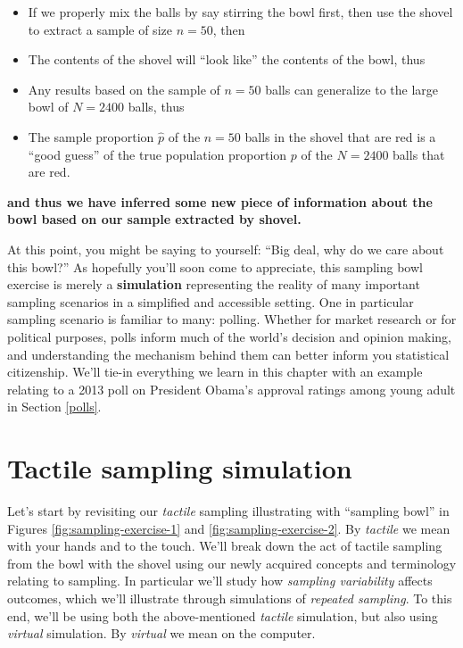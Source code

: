 \documentclass[12pt,]{krantz}
\providecommand{\tightlist}{%
  \setlength{\itemsep}{0pt}\setlength{\parskip}{0pt}}
\renewenvironment{quote}{\begin{VF}}{\end{VF}}
\begin{document}
\begin{quote}
\begin{itemize}
\tightlist
\item
  If we properly mix the balls by say stirring the bowl first, then use
  the shovel to extract a sample of size \(n=50\), then
\item
  The contents of the shovel will ``look like'' the contents of the
  bowl, thus
\item
  Any results based on the sample of \(n=50\) balls can generalize to
  the large bowl of \(N=2400\) balls, thus
\item
  The sample proportion \(\widehat{p}\) of the \(n=50\) balls in the
  shovel that are red is a ``good guess'' of the true population
  proportion \(p\) of the \(N=2400\) balls that are red.
\end{itemize}
\end{quote}

\textbf{and thus we have inferred some new piece of information about
the bowl based on our sample extracted by shovel.}

At this point, you might be saying to yourself: ``Big deal, why do we
care about this bowl?'' As hopefully you'll soon come to appreciate,
this sampling bowl exercise is merely a \textbf{simulation} representing
the reality of many important sampling scenarios in a simplified and
accessible setting. One in particular sampling scenario is familiar to
many: polling. Whether for market research or for political purposes,
polls inform much of the world's decision and opinion making, and
understanding the mechanism behind them can better inform you
statistical citizenship. We'll tie-in everything we learn in this
chapter with an example relating to a 2013 poll on President Obama's
approval ratings among young adult in Section \ref{polls}.

\section{Tactile sampling simulation}\label{tactile}

Let's start by revisiting our \emph{tactile} sampling illustrating with
``sampling bowl'' in Figures \ref{fig:sampling-exercise-1} and
\ref{fig:sampling-exercise-2}. By \emph{tactile} we mean with your hands
and to the touch. We'll break down the act of tactile sampling from the
bowl with the shovel using our newly acquired concepts and terminology
relating to sampling. In particular we'll study how \emph{sampling
variability} affects outcomes, which we'll illustrate through
simulations of \emph{repeated sampling}. To this end, we'll be using
both the above-mentioned \emph{tactile} simulation, but also using
\emph{virtual} simulation. By \emph{virtual} we mean on the computer.
\end{document}
